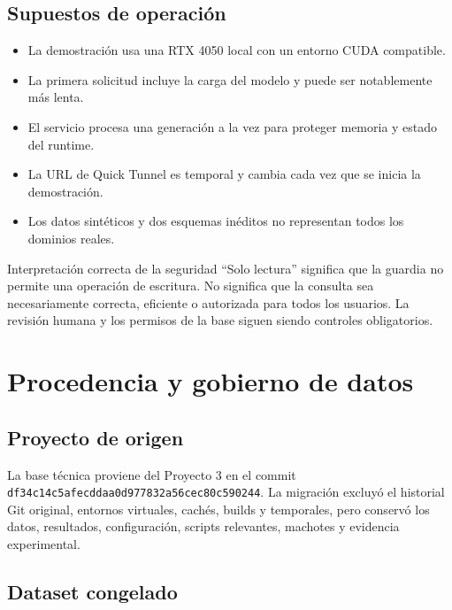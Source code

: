 \documentclass[11pt,letterpaper]{article}
\newcommand{\code}[1]{\texttt{#1}}
\begin{document}
\subsection{Supuestos de operación}

\begin{itemize}
  \item La demostración usa una RTX 4050 local con un entorno CUDA compatible.
  \item La primera solicitud incluye la carga del modelo y puede ser notablemente más lenta.
  \item El servicio procesa una generación a la vez para proteger memoria y estado del runtime.
  \item La URL de Quick Tunnel es temporal y cambia cada vez que se inicia la demostración.
  \item Los datos sintéticos y dos esquemas inéditos no representan todos los dominios reales.
\end{itemize}

\begin{advertencia}{Interpretación correcta de la seguridad}
``Solo lectura'' significa que la guardia no permite una operación de escritura. No significa que la
consulta sea necesariamente correcta, eficiente o autorizada para todos los usuarios. La revisión
humana y los permisos de la base siguen siendo controles obligatorios.
\end{advertencia}

\section{Procedencia y gobierno de datos}

\subsection{Proyecto de origen}

La base técnica proviene del Proyecto 3 en el commit
\code{df34c14c5afecddaa0d977832a56cec80c590244}. La migración excluyó el historial Git original,
entornos virtuales, cachés, builds y temporales, pero conservó los datos, resultados, configuración,
scripts relevantes, machotes y evidencia experimental.

\subsection{Dataset congelado}
\end{document}

